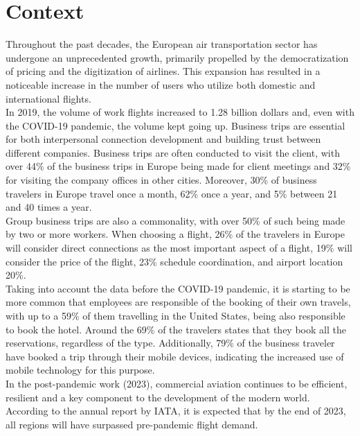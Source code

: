 \documentclass[../memory.tex]{subfiles}
\begin{document}
\section{Context}
Throughout the past decades, the European air transportation sector has
undergone an unprecedented growth, primarily propelled by the democratization of
pricing and the digitization of airlines. This expansion has resulted in a
noticeable increase in the number of users who utilize both domestic and
international flights.
\\[8pt]
In 2019, the volume of work flights increased to 1.28 billion
dollars\cite{flight-volume} and, even with the COVID-19 pandemic, the volume
kept going up\cite{covid-flight-volume}. Business trips are essential for both
interpersonal connection development and building trust between different
companies\cite{company-trust}. Business trips are often conducted to visit
the client, with over 44\% of the business trips in Europe being made for
client meetings and 32\% for visiting the company offices in other
cities\cite{visit-client}. Moreover, 30\% of business travelers in Europe travel
once a month, 62\% once a year, and 5\% between 21 and 40 times a
year\cite{visit-client}.
\\[8pt]
Group business trips are also a commonality, with over 50\% of such being made
by two or more workers\cite{visit-client}. When choosing a flight, 26\% of the
travelers in Europe will consider direct connections as the most important
aspect of a flight, 19\% will consider the price of the flight, 23\% schedule
coordination, and airport location 20\%\cite{visit-client}.
\\[8pt]
Taking into account the data before the COVID-19 pandemic, it is starting to be
more common that employees are responsible of the booking of their own travels,
with up to a 59\% of them travelling in the United States, being also
responsible to book the hotel\cite{employee-books}. Around the 69\% of the
travelers states that they book all the reservations, regardless of the type.
Additionally, 79\% of the business traveler have booked a trip through their
mobile devices, indicating the increased use of mobile technology for this
purpose\cite{mobile-booking}.
\\[8pt]
In the post-pandemic work (2023), commercial aviation continues to be efficient,
resilient and a key component to the development of the modern world. According
to the annual report by IATA\cite{iata-report}, it is expected that by the end
of 2023, all regions will have surpassed pre-pandemic flight demand.
\end{document}
